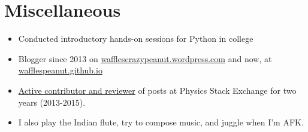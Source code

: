 \documentclass[11pt,a4paper,sans]{moderncv}        %
\newcommand\chref[3][linky]{\href{#2}{\color{#1}#3}}
\begin{document}

\section{Miscellaneous}
\begin{itemize}
\item Conducted introductory hands-on sessions for Python in college
\item Blogger since 2013 on \chref{https://wafflescrazypeanut.wordpress.com/}{wafflescrazypeanut.wordpress.com} and now, at \chref{https://wafflespeanut.github.io/}{wafflespeanut.github.io}
\item \chref{https://physics.stackexchange.com/users/11062}{Active contributor and reviewer} of posts at Physics Stack Exchange for two years (2013-2015).
\item I also play the Indian flute, try to compose music, and juggle when I'm AFK.
\end{itemize}



\end{document}
